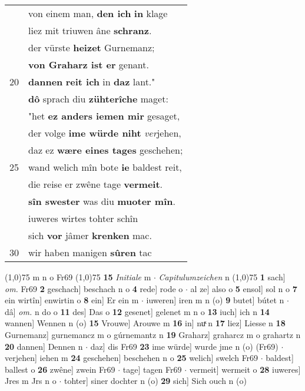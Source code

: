 \documentclass[8pt,a4paper,notitlepage]{article}
\begin{document}
\begin{table}[ht]
\begin{minipage}[t]{0.5\linewidth}
\begin{tabular}{rl}
 & von einem man, \textbf{den ich} \textbf{in} klage\\ 
 & liez mit triuwen âne \textbf{schranz}.\\ 
 & der vürste \textbf{heizet} Gurnemanz;\\ 
 & \textbf{von Graharz ist er} genant.\\ 
20 & \textbf{dannen} \textbf{reit ich} in \textbf{daz} lant."\\ 
 & \textbf{dô} sprach diu \textbf{zühterîche} maget:\\ 
 & "het \textbf{ez anders iemen mir} gesaget,\\ 
 & der volge \textbf{ime würde niht} \textit{ver}jehen,\\ 
 & daz ez \textbf{wære eines tages} geschehen;\\ 
25 & wand welich mîn bote \textbf{ie} baldest reit,\\ 
 & die reise er zwêne tage \textbf{vermeit}.\\ 
 & \textbf{sîn swester} was diu \textbf{muoter mîn}.\\ 
 & iuweres wirtes tohter schîn\\ 
 & sich \textbf{vor} jâmer \textbf{krenken} mac.\\ 
30 & wir haben manigen \textbf{sûren} tac\\ 
\end{tabular}
\scriptsize
\line(1,0){75} \newline
m n o Fr69 \newline
\line(1,0){75} \newline
\textbf{15} \textit{Initiale} m   $\cdot$ \textit{Capitulumzeichen} n  \newline
\line(1,0){75} \newline
\textbf{1} sach] \textit{om.} Fr69 \textbf{2} geschach] beschach n o \textbf{4} rede] rode o  $\cdot$ al ze] also o \textbf{5} ensol] sol n o \textbf{7} ein wirtîn] enwirtin o \textbf{8} ein] Er ein m  $\cdot$ iuweren] iren m n (o) \textbf{9} butet] bútet n  $\cdot$ dâ] \textit{om.} n do o \textbf{11} des] Das o \textbf{12} gesenet] gelenet m n o \textbf{13} iuch] ich n \textbf{14} wannen] Wennen n (o) \textbf{15} Vrouwe] Arouwe m \textbf{16} in] nuͯ n \textbf{17} liez] Liesse n \textbf{18} Gurnemanz] gurnemancz m o gúrnemantz n \textbf{19} Graharz] graharcz m o grahartz n \textbf{20} dannen] Dennen n  $\cdot$ daz] dis Fr69 \textbf{23} ime würde] wurde jme n (o) (Fr69)  $\cdot$ verjehen] iehen m \textbf{24} geschehen] beschehen n o \textbf{25} welich] swelch Fr69  $\cdot$ baldest] ballest o \textbf{26} zwêne] zwein Fr69  $\cdot$ tage] tagen Fr69  $\cdot$ vermeit] wermeit o \textbf{28} iuweres] Jres m Jrs n o  $\cdot$ tohter] siner dochter n (o) \textbf{29} sich] Sich ouch n (o) \newline
\end{minipage}
\end{table}
\end{document}
